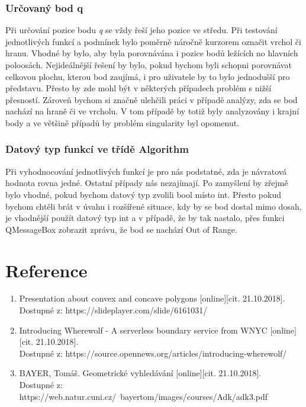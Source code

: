 \documentclass[a4paper, 12pt]{article}
\begin{document}
\subsubsection{Určovaný bod q}
Při určování pozice bodu \textit{q} se vždy řeší jeho pozice ve středu. Při testování jednotlivých funkcí a podmínek bylo poměrně náročně kurzorem označit vrchol či hranu. Vhodné by bylo, aby byla porovnávána i pozice bodů ležících no hlavních poloosách. Nejideálnější řešení by bylo, pokud bychom byli schopni porovnávat celkovou plochu, kterou bod zaujímá, i pro uživatele by to bylo jednodušší pro představu. Přesto by zde mohl být v některých případech problém s nižší přesností. Zároveň bychom si značně ulehčili práci v případě analýzy, zda se bod nachází na hraně či ve vrcholu. V tom případě by totiž byly analyzovány i krajní body a ve většině případů by problém singularity byl opomenut.

\subsubsection{Datový typ funkcí ve třídě Algorithm}
Při vyhodnocování jednotlivých funkcí je pro nás podstatné, zda je návratová hodnota rovna jedné. Ostatní případy nás nezajímají. Po zamyšlení by zřejmě bylo vhodné, pokud bychom datový typ zvolili bool místo int. Přesto pokud bychom chtěli brát v úvahu i rozšířené situace, kdy by se bod dostal mimo dosah, je vhodnější použít datový typ int a v případě, že by tak nastalo, přes funkci QMessageBox zobrazit zprávu, že bod se nachází Out of Range. 


\clearpage
\section{Reference}

\begin{enumerate}
\item  Presentation about convex and concave polygons [online][cit. 21.10.2018]. \\
Dostupné z: https://slideplayer.com/slide/6161031/  \\
\item  Introducing Wherewolf - A serverless boundary service from WNYC [online][cit. 21.10.2018]. \\
Dostupné z: https://source.opennews.org/articles/introducing-wherewolf/  \\
\item  BAYER, Tomáš. Geometrické vyhledávání [online][cit. 21.10.2018]. \\
Dostupné z: https://web.natur.cuni.cz/~bayertom/images/courses/Adk/adk3.pdf  \\

\end{enumerate}
\end{document}
